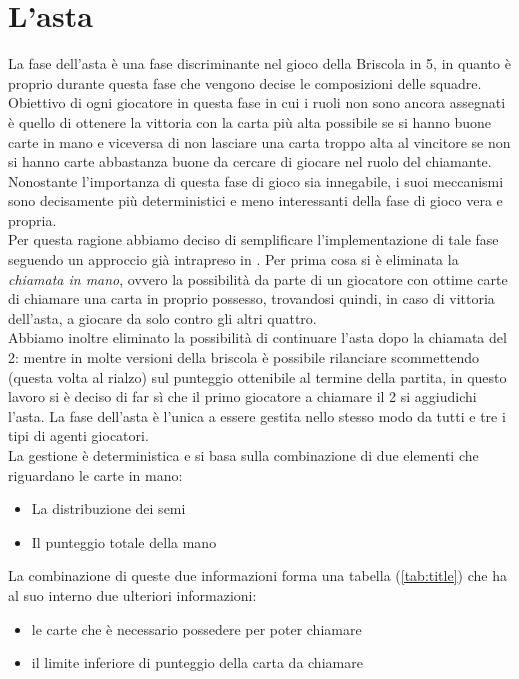 \section{L'asta}

La fase dell'asta è una fase discriminante nel gioco della Briscola in 5, in quanto è proprio durante questa fase che vengono decise le composizioni delle squadre.\\
Obiettivo di ogni giocatore in questa fase in cui i ruoli non sono ancora assegnati è quello di ottenere la vittoria con la carta più alta possibile se si hanno buone carte in mano e viceversa di non lasciare una carta troppo alta al vincitore se non si hanno carte abbastanza buone da cercare di giocare nel ruolo del chiamante.\\
Nonostante l'importanza di questa fase di gioco sia innegabile, i suoi meccanismi sono decisamente più deterministici e meno interessanti della fase di gioco vera e propria.\\
Per questa ragione abbiamo deciso di semplificare l'implementazione di tale fase seguendo un approccio già intrapreso in \cite{villa}.
Per prima cosa si è eliminata la \emph{chiamata in mano}, ovvero la possibilità da parte di un giocatore con ottime carte di chiamare una carta in proprio possesso, trovandosi quindi, in caso di vittoria dell'asta, a giocare da solo contro gli altri quattro.\\
Abbiamo inoltre eliminato la possibilità di continuare l'asta dopo la chiamata del 2: mentre in molte versioni della briscola è possibile rilanciare scommettendo (questa volta al rialzo) sul punteggio ottenibile al termine della partita, in questo lavoro si è deciso di far sì che il primo giocatore a chiamare il 2 si aggiudichi l'asta.
La fase dell'asta è l'unica a essere gestita nello stesso modo da tutti e tre i tipi di agenti giocatori.\\
La gestione è deterministica e si basa sulla combinazione di due elementi che riguardano le carte in mano:
\begin{itemize}
   \item La distribuzione dei semi
   \item Il punteggio totale della mano
\end{itemize}
La combinazione di queste due informazioni forma una tabella (\ref{tab:title}) che ha al suo interno due ulteriori informazioni:
\begin{itemize}
   \item le carte che è necessario possedere per poter chiamare
   \item il limite inferiore di punteggio della carta da chiamare 
\end{itemize}


